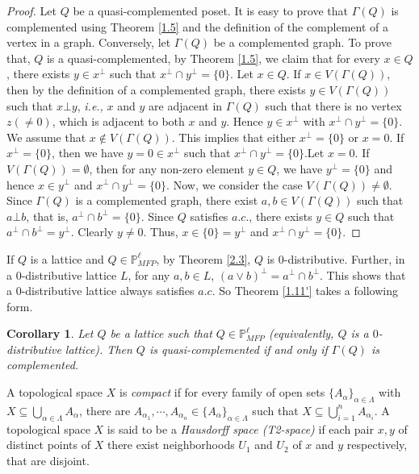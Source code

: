 \documentclass[10pt,one side,emlines]{amsart}
\newtheorem{corollary}[lem]{Corollary}
\theoremstyle{definition}
\begin{document}
\begin{proof} Let $Q$ be a quasi-complemented poset. It is easy to prove that  $\Gamma(Q)$ is complemented using Theorem \ref{1.5} and the definition of the complement of a vertex in a graph. Conversely, let $\Gamma(Q)$ be a complemented graph. To prove that, $Q$ is a quasi-complemented, by Theorem \ref{1.5}, we claim that for every $x\in Q$, there exists $y \in x^{\perp}$ such that $x^{\perp}\cap y^{\perp}=\{0\}$. Let $x\in Q$. If $x\in V(\Gamma(Q))$, then by the definition of a complemented graph, there exists $y\in V(\Gamma(Q))$ such that $x\bot y$, {\it{i.e.,}} $x$ and $y$ are adjacent in $\Gamma(Q)$ such that there is no vertex $z (\neq 0)$, which is adjacent to both $x$ and $y$. Hence $y \in x^{\perp}$ with $x^{\perp}\cap y^{\perp}=\{0\}$. We assume that $x\notin V(\Gamma(Q))$. This implies that either $x^{\perp}=\{0\}$ or $x=0$. \newline If $x^{\perp}=\{0\}$, then we have $y=0\in x^{\perp}$ such that $x^{\perp}\cap y^{\perp}=\{0\}$.\newline Let $x=0$. If $V(\Gamma(Q)) = \emptyset$, then for any non-zero element $y\in Q$, we have $y^{\perp }=\{0\}$ and hence $x \in y^\perp$ and $x^\perp \cap y^\perp=\{0\}$. Now, we consider the case $V(\Gamma(Q))\neq \emptyset $. Since $\Gamma(Q)$ is a complemented graph, there exist $a,b\in V(\Gamma(Q))$ such that $a \bot b$, that is, $a^{\perp}\cap b^{\perp}=\{0\}$. Since $Q$ satisfies $a.c.$, there exists $y\in Q$ such that $a^{\perp} \cap b^{\perp}=y^{\perp}$. Clearly $y\neq 0$. Thus,  $x \in \{0\} = y^{\perp}$ and $x^{\perp}\cap y^{\perp}=\{0\}$. 
\end{proof}          

If $Q$ is a lattice and $Q\in \mathbb{P}^{\ell}_{MFP}$, by Theorem \ref{2.3}, $Q$ is $0$-distributive. Further, in a  $0$-distributive lattice $L$, for any $a,b\in L$, $(a\vee b)^{\perp}=a^{\perp}\cap b^{\perp}$. This shows that a $0$-distributive lattice always satisfies $a.c.$ So  Theorem \ref{1.11'} takes a following form.

\begin{corollary}\label{1.12'}
	Let $Q$ be a lattice such that $Q\in \mathbb{P}^{\ell}_{MFP}$ (equivalently, $Q$ is a $0$-distributive lattice). Then $Q$ is  quasi-complemented if and only if $\Gamma(Q)$ is complemented.       
\end{corollary}                                                          
A topological space $X$ is  {\it compact} if for every
family of open sets $\{A_{\alpha}\}_{\alpha \in \Lambda} $ with $X \subseteq \bigcup_{\alpha \in \Lambda}A_{\alpha}$, there are $A_{\alpha_1},\cdots, A_{\alpha_n} \in \{A_\alpha \}_{\alpha \in \Lambda}$
such that $X \subseteq  \bigcup_{i=1}^{n}A_{\alpha_{i}}$. A topological space $X$ is said to be a \textit{Hausdorff space (T2-space)} if each pair $x, y$ of distinct points of $X$ there exist	neighborhoods $U_1$ and $U_2$ of $x$ and $y$ respectively, that are disjoint.
\end{document}
